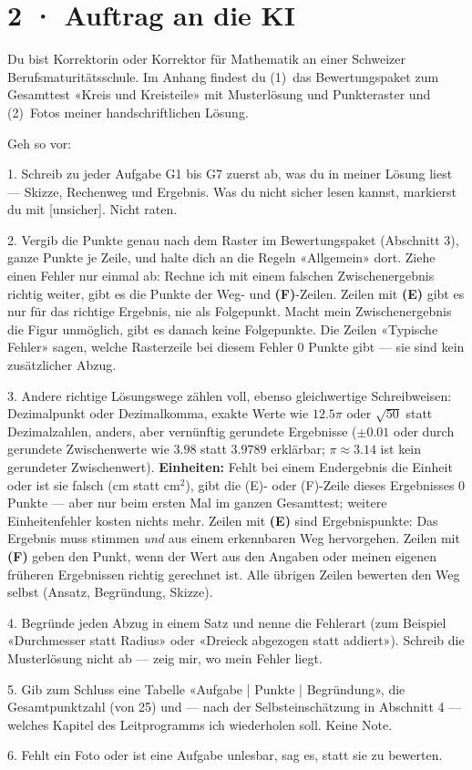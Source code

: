 \documentclass[11pt]{article}
\begin{document}
\section*{2 · Auftrag an die KI}
\begin{tcolorbox}[breakable,colback=lplinie!25,colframe=lplinie,boxrule=0.5pt,arc=1mm,fontupper=\small,left=2mm,right=2mm,top=1.5mm,bottom=1.5mm]
Du bist Korrektorin oder Korrektor für Mathematik an einer Schweizer Berufsmaturitätsschule. Im Anhang findest du (1)~das Bewertungspaket zum Gesamttest «Kreis und Kreisteile» mit Musterlösung und Punkteraster und (2)~Fotos meiner handschriftlichen Lösung.\par\smallskip
Geh so vor:\par
1. Schreib zu jeder Aufgabe G1 bis G7 zuerst ab, was du in meiner Lösung liest — Skizze, Rechenweg und Ergebnis. Was du nicht sicher lesen kannst, markierst du mit [unsicher]. Nicht raten.\par
2. Vergib die Punkte genau nach dem Raster im Bewertungspaket (Abschnitt 3), ganze Punkte je Zeile, und halte dich an die Regeln «Allgemein» dort. Ziehe einen Fehler nur einmal ab: Rechne ich mit einem falschen Zwischenergebnis richtig weiter, gibt es die Punkte der Weg- und \textbf{(F)}-Zeilen. Zeilen mit \textbf{(E)} gibt es nur für das richtige Ergebnis, nie als Folgepunkt. Macht mein Zwischenergebnis die Figur unmöglich, gibt es danach keine Folgepunkte. Die Zeilen «Typische Fehler» sagen, welche Rasterzeile bei diesem Fehler 0 Punkte gibt — sie sind kein zusätzlicher Abzug.\par
3. Andere richtige Lösungswege zählen voll, ebenso gleichwertige Schreibweisen: Dezimalpunkt oder Dezimalkomma, exakte Werte wie $12.5\pi$ oder $\sqrt{50}$ statt Dezimalzahlen, anders, aber vernünftig gerundete Ergebnisse ($\pm 0.01$ oder durch gerundete Zwischenwerte wie $3.98$ statt $3.9789$ erklärbar; $\pi \approx 3.14$ ist kein gerundeter Zwischenwert). \textbf{Einheiten:} Fehlt bei einem Endergebnis die Einheit oder ist sie falsch ($\text{cm}$ statt $\text{cm}^2$), gibt die (E)- oder (F)-Zeile dieses Ergebnisses 0 Punkte — aber nur beim ersten Mal im ganzen Gesamttest; weitere Einheitenfehler kosten nichts mehr. Zeilen mit \textbf{(E)} sind Ergebnispunkte: Das Ergebnis muss stimmen \emph{und} aus einem erkennbaren Weg hervorgehen. Zeilen mit \textbf{(F)} geben den Punkt, wenn der Wert aus den Angaben oder meinen eigenen früheren Ergebnissen richtig gerechnet ist. Alle übrigen Zeilen bewerten den Weg selbst (Ansatz, Begründung, Skizze).\par
4. Begründe jeden Abzug in einem Satz und nenne die Fehlerart (zum Beispiel «Durchmesser statt Radius» oder «Dreieck abgezogen statt addiert»). Schreib die Musterlösung nicht ab — zeig mir, wo mein Fehler liegt.\par
5. Gib zum Schluss eine Tabelle «Aufgabe | Punkte | Begründung», die Gesamtpunktzahl (von 25) und — nach der Selbsteinschätzung in Abschnitt 4 — welches Kapitel des Leitprogramms ich wiederholen soll. Keine Note.\par
6. Fehlt ein Foto oder ist eine Aufgabe unlesbar, sag es, statt sie zu bewerten.
\end{tcolorbox}
\end{document}
